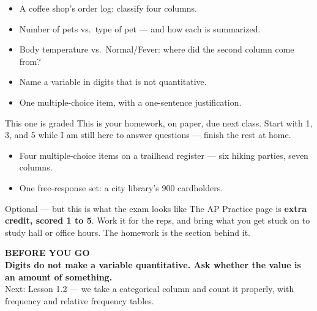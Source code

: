 \documentclass[aspectratio=169, 11pt]{beamer}
\begin{document}
\begin{frame}[t, plain]
  \begin{itemize}\setlength{\itemsep}{5pt}
    \item A coffee shop's order log: classify four columns.
    \item Number of pets vs.\ type of pet --- and how each is summarized.
    \item Body temperature vs.\ Normal/Fever: where did the second column come from?
    \item Name a variable in digits that is not quantitative.
    \item One multiple-choice item, with a one-sentence justification.
  \end{itemize}
  \begin{block}{This one is graded}
    This is your  homework, on paper, due next class. Start with 1, 3, and 5
    while I am still here to answer questions --- finish the rest at home.
  \end{block}
\end{frame}

\begin{frame}[t, plain]
  \begin{itemize}\setlength{\itemsep}{5pt}
    \item Four multiple-choice items on a trailhead register --- six hiking parties,
          seven columns.
    \item One free-response set: a city library's 900 cardholders.
  \end{itemize}
  \begin{block}{Optional --- but this is what the exam looks like}
    The AP Practice page is \textbf{extra credit, scored 1 to 5}. Work it for the reps,
    and bring what you get stuck on to study hall or office hours. The 
    homework is the section behind it.
  \end{block}
\end{frame}

{
\begin{frame}[plain]
  \vspace{1.5cm}\hspace{0.8cm}%
  \begin{minipage}{0.86\textwidth}
    {\color{goldacc}\bfseries\small BEFORE YOU GO}\\[0.7cm]
    {\color{white}\bfseries\Large Digits do not make a variable quantitative. Ask whether
    the value is an amount of something.}\\[0.9cm]
    {\color{skymid}\small Next: Lesson 1.2 --- we take a categorical column and count it
    properly, with frequency and relative frequency tables.}
  \end{minipage}
\end{frame}
}
\end{document}
